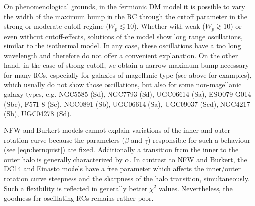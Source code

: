 On phenomenological grounds, in the fermionic DM model it is possible to vary the width of the maximum bump in the RC through the cutoff parameter in the strong or moderate cutoff regime ($W_p \lesssim 10$). Whether with weak ($W_p \gtrsim 10$) or even without cutoff-effects,  solutions of the model show long range oscillations, similar to the isothermal model. In any case, these  oscillations have a too long wavelength and therefore do not offer a convenient explanation. On the other hand, in the case of strong cutoff, we obtain a narrow maximum bump necessary for many RCs, especially for galaxies of magellanic type (see above for examples), which usually do not show those oscillations, but also for some non-magellanic galaxy types, e.g. NGC5585 (Sd), NGC7793 (Sd), UGC06614 (Sa), ESO079-G014 (Sbc), F571-8 (Sc), NGC0891 (Sb), UGC06614 (Sa), UGC09037 (Scd), NGC4217 (Sb), UGC04278 (Sd).

NFW and Burkert models cannot explain variations of the inner and outer rotation curve because the parameters ($\beta$ and $\gamma$) responsible for such a behaviour (see \cref{eqn:hernquist}) are fixed. Additionally a transition from the inner to the outer halo is generally characterized by $\alpha$. In contrast to NFW and Burkert, the DC14 and Einasto models have a free parameter which affects the inner/outer rotation curve steepness and the sharpness of the halo transition, simultaneously. Such a flexibility is reflected in generally better $\chi^2$ values. Nevertheless, the goodness for oscillating RCs remains rather poor.